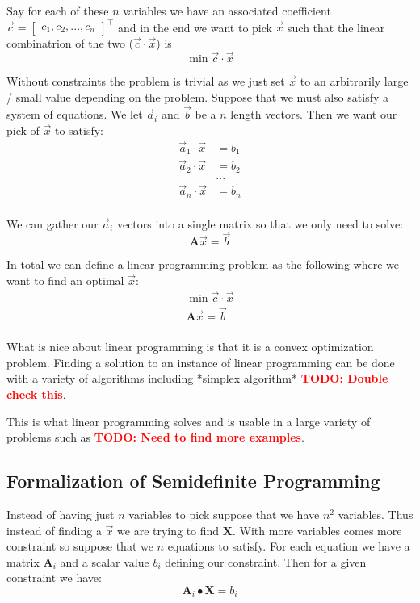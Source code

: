 \documentclass{article}
\begin{document}
Say for each of these \( n \) variables we have an associated coefficient \( \vec{c} = \begin{bmatrix} c_1, c_2, ..., c_n  \end{bmatrix}^\top \) and in the end we want to pick \( \vec{x} \) such that the linear combinatrion of the two (\( \vec{c} \cdot \vec{x} \)) is
\[
\min \vec{c} \cdot \vec{x}
\]

Without constraints the problem is trivial as we just set \( \vec{x} \) to an arbitrarily large / small value depending on the problem. Suppose that we must also satisfy a system of equations. We let \( \vec{a}_i \) and \( \vec{b} \) be a \( n \) length vectors. Then we want our pick of \( \vec{x} \) to satisfy:
\begin{align*}
\vec{a}_1 \cdot \vec{x} &= b_1 \\
\vec{a}_2 \cdot \vec{x} &= b_2 \\
& ...  \\
\vec{a}_n \cdot \vec{x} &= b_n \\
\end{align*}

We can gather our \( \vec{a}_i \) vectors into a single matrix so that we only need to solve:
\[
\mathbf{A} \vec{x} = \vec{b}
\]

In total we can define a linear programming problem as the following where we want to find an optimal \( \vec{x} \):
\begin{align*}
  \min \vec{c} \cdot \vec{x} \\
  \mathbf{A} \vec{x} = \vec{b} \\
\end{align*}


What is nice about linear programming is that it is a convex optimization problem. Finding a solution to an instance of linear programming can be done with a variety of algorithms including *simplex algorithm* \textbf{\textcolor{red}{TODO: Double check this}}.

This is what linear programming solves and is usable in a large variety of problems such as
\textbf{\textcolor{red}{TODO: Need to find more examples}}.

\subsection{Formalization of Semidefinite Programming}
Instead of having just \( n \) variables to pick suppose that we have \( n^2 \) variables. Thus instead of finding a \( \vec{x} \) we are trying to find \( \mathbf{X} \). With more variables comes more constraint so suppose that we \( n \) equations to satisfy. For each equation we have a matrix \( \mathbf{A}_i \) and a scalar value \( b_i \) defining our constraint. Then for a given constraint we have:
\[
\mathbf{A}_i \bullet \mathbf{X} = b_i
\]
\end{document}
